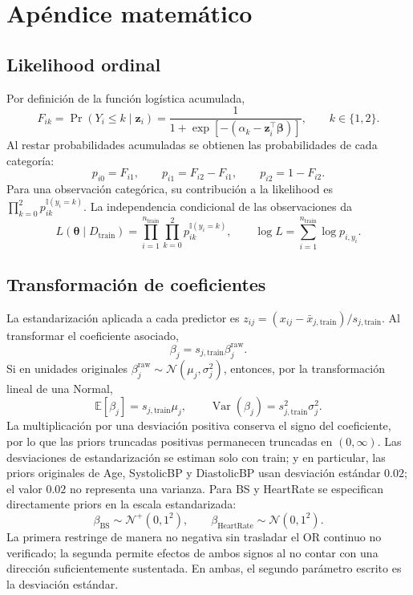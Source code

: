 \section{Apéndice matemático}
\subsection{Likelihood ordinal}
Por definición de la función logística acumulada,
\[
F_{ik}=\Pr(Y_i\leq k\mid\mathbf{z}_i)
=\frac{1}{1+\exp[-(\alpha_k-\mathbf{z}_i^\top
\boldsymbol{\beta})]},\qquad k\in\{1,2\}.
\]
Al restar probabilidades acumuladas se obtienen las probabilidades de cada
categoría:
\[
p_{i0}=F_{i1},\qquad p_{i1}=F_{i2}-F_{i1},\qquad p_{i2}=1-F_{i2}.
\]
Para una observación categórica, su contribución a la likelihood es
$\prod_{k=0}^{2}p_{ik}^{\mathbb{I}(y_i=k)}$. La independencia condicional de
las observaciones da
\[
L(\boldsymbol{\theta}\mid D_{\mathrm{train}})
=\prod_{i=1}^{n_{\mathrm{train}}}
\prod_{k=0}^{2}p_{ik}^{\mathbb{I}(y_i=k)},
\qquad
\log L=\sum_{i=1}^{n_{\mathrm{train}}}\log p_{i,y_i}.
\]

\subsection{Transformación de coeficientes}
La estandarización aplicada a cada predictor es
$z_{ij}=(x_{ij}-\bar{x}_{j,\mathrm{train}})/s_{j,\mathrm{train}}$.
Al transformar el coeficiente asociado,
\[
\beta_j=s_{j,\mathrm{train}}\beta_j^{\mathrm{raw}}.
\]
Si en unidades originales
$\beta_j^{\mathrm{raw}}\sim\mathcal{N}(\mu_j,\sigma_j^2)$, entonces, por la
transformación lineal de una Normal,
\[
\mathbb{E}[\beta_j]
=s_{j,\mathrm{train}}\mu_j,\qquad
\operatorname{Var}(\beta_j)
=s_{j,\mathrm{train}}^2\sigma_j^2.
\]
La multiplicación por una desviación positiva conserva el signo del
coeficiente, por lo que las priors truncadas positivas permanecen truncadas en
$(0,\infty)$. Las desviaciones de estandarización se estiman solo con train; y en particular,
las priors originales de Age, SystolicBP y DiastolicBP usan
desviación estándar $0.02$; el valor $0.02$ no representa una varianza. Para
BS y HeartRate se especifican directamente priors en la escala estandarizada:
\[
\beta_{\mathrm{BS}}\sim\mathcal{N}^{+}(0,1^2),\qquad
\beta_{\mathrm{HeartRate}}\sim\mathcal{N}(0,1^2).
\]
La primera restringe de manera no negativa sin trasladar el OR continuo no
verificado; la segunda permite efectos de ambos signos al no contar con una
dirección suficientemente sustentada. En ambas, el segundo parámetro escrito
es la desviación estándar.

